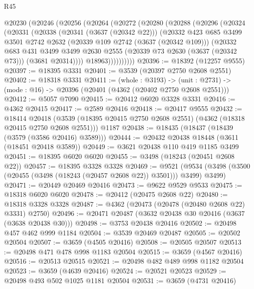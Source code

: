 \begin{lexlean}{R45}
\begin{coremodule}
    @20230
      (@20246
        (@20256
          (@20264
            (@20272
              (@20280
                (@20288
                  (@20296
                    (@20324
                      (@20331
                        (@20338
                          (@20341 (@3637 (@20342 @22)))
                          (@20332
                            @423
                            @685
                            @3499
                            @3501
                            @2742
                            @2632
                            (@20339 @109 @2742 (@3637 (@20342 @109)))
                            (@20332
                              @683
                              @431
                              @3499
                              @3499
                              @2630
                              @2555
                              (@20339 @73 @2630 (@3637 (@20342 @73)))
                              (@3681 @20314))))
                        @18963))))))))))
@20396 := @18392 (@12257 @9555)
@20397 := @18395 @3331
@20401 := @3539 (@20397 @2750 @2608 @2551)
@20402 := @18318 @3331
@20411 := (whole : @3193) ->
  (unit : @2731) -> (mode : @16) -> @20396 (@20401 (@4362 (@20402 @2750 @2608 @2551)))
@20412 := @5057 @7090
@20415 := @20412 @6020 @3328 @3331
@20416 := @4362 @20415
@20417 := @2589 @20416
@20418 := @20417 @9555
@20432 := @18414
    @20418
    (@3539 (@18395 @20415 @2750 @2608 @2551) (@4362 (@18318 @20415 @2750 @2608 @2551)))
    @1187
@20438 := @18435 (@18437 (@18439 (@3579 (@3586 @20416) @3589)))
@20444 := @20432 @20438 @18448 (@3611 (@18451 @20418 @3589))
@20449 := @3621 @20438 @110 @419 @1185 @3499
@20451 := @18395 @6020 @6020
@20455 := @3498 (@18243 (@20451 @2608 @22))
@20457 := @18395 @3328 @3328
@20469 := @9521
    (@9534 (@3498 (@3500 (@20455 (@3498 (@18243 (@20457 @2608 @22)) @3501))) @3499) @3499)
@20471 := @20449 @20469 @20416
@20473 := @9622 @9529 @9533
@20475 := @18318 @6020 @6020
@20478 := @20412 (@20475 @2608 @22)
@20480 := @18318 @3328 @3328
@20487 := @4362 (@20473 (@20478 (@20480 @2608 @22) @3331) @2750)
@20496 := @20471 @20487 (@3632 @20438 @30 @20416 (@3637 (@3638 @20438 @30)))
@20498 := @3753 @20438 @20416
@20502 := @20498 @457 @462 @999 @1184
@20504 := @3539 @20469 @20487
@20505 := @20502 @20504
@20507 := @3659 (@4505 @20416)
@20508 := @20505 @20507
@20513 := @20498 @471 @478 @998 @1183 @20504
@20515 := @3659 (@4567 @20416)
@20516 := @20513 @20515
@20521 := @20498 @482 @489 @998 @1182 @20504
@20523 := @3659 (@4639 @20416)
@20524 := @20521 @20523
@20529 := @20498 @493 @502 @1025 @1181 @20504
@20531 := @3659 (@4731 @20416)

\end{coremodule}
\end{lexlean}
